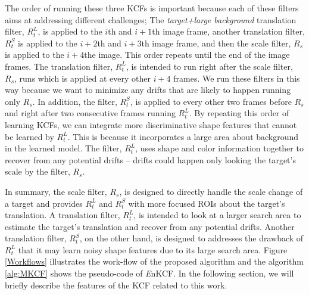 \documentclass{bmvc2k}
\begin{document}
The order of running these three KCFs is important because each of
these filters aims at addressing different challenges; The
\textit{target+large background} translation filter, $R_{t}^{L}$, is
applied to the $i$th and $i+1$th image frame, another translation
filter, $R_{t}^{S}$ is applied to the $i+2$th and $i+3$th image frame,
and then the scale filter, $R_{s}$ is applied to the $i+4$the
image. This order repeats until the end of the image frames. The
translation filter, $R_{t}^{L}$, is intended to run right after the
scale filter, $R_s$, runs which is applied at every other $i+4$
frames. We run these filters in this way because we want to minimize
any drifts that are likely to happen running only $R_{s}$. In
addition, the filter, $R_{t}^{S}$, is applied to every other two
frames before $R_{s}$ and right after two consecutive frames running
$R_{t}^{L}$. By repeating this order of learning KCFs, we can
integrate more discriminative shape features that cannot be learned by
$R_{t}^{L}$. This is because it incorporates a large area about
background in the learned model. The filter, $R_{t}^{L}$, uses shape
and color information together to recover from any potential drifts --
drifts could happen only looking the target's scale by the filter,
$R_{s}$.

In summary, the scale filter, $R_{s}$, is designed to directly handle
the scale change of a target and provides $R_{t}^{L}$ and $R_{t}^{S}$
with more focused ROIs about the target's translation. A translation
filter, $R_{t}^{L}$, is intended to look at a larger search area to
estimate the target's translation and recover from any potential
drifts. Another translation filter, $R_{t}^{S}$, on the other hand, is
designed to addresses the drawback of $R_{t}^{L}$ that it may learn
noisy shape features due to its large search area. Figure
\ref{Workflows} illustrates the work-flow of the proposed algorithm
and the algorithm \ref{alg:MKCF} shows the pseudo-code of {\it
  E}nKCF. In the following section, we will briefly describe the
features of the KCF related to this work.
\end{document}
